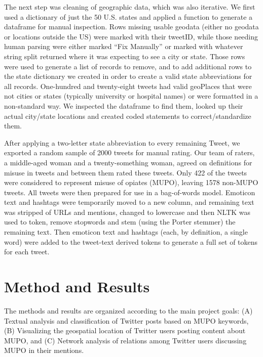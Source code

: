 \documentclass[sigconf]{acmart}
\begin{document}

The next step was cleaning of geographic data, which was also iterative. We 
first used a dictionary of just the 50 U.S. states and applied a function to 
generate a dataframe for manual inspection. Rows missing usable geodata (either 
no geodata or locations outside the US) were marked with their tweetID, while 
those needing human parsing were either marked ``Fix Manually'' or marked with 
whatever string split returned where it was expecting to see a city or state. 
Those rows were used to generate a list of records to remove, and to add 
additional rows to the state dictionary we created in order to create a valid 
state abbreviations for all records. One-hundred and twenty-eight tweets had 
valid geoPlaces that were not cities or states (typically university or hospital 
names) or were formatted in a non-standard way. We inspected the dataframe to 
find them, looked up their actual city/state locations and created coded 
statements to correct/standardize them.
 
After applying a two-letter state abbreviation to every remaining Tweet, we 
exported a random sample of 2000 tweets for manual rating. Our team of raters, 
a middle-aged woman and a twenty-something woman, agreed on definitions for 
misuse in tweets and between them rated these tweets. Only 422 of the tweets 
were considered to represent misuse of opiates (MUPO), leaving 1578 non-MUPO 
tweets. All tweets were then prepared for use in a bag-of-words model. Emoticon 
text and hashtags were temporarily moved to a new column, and remaining text 
was stripped of URLs and mentions, changed to lowercase and then NLTK was used 
to token, remove stopwords and stem (using the Porter stemmer) the remaining text. 
Then emoticon text and hashtags (each, by definition, a single word) were added 
to the tweet-text derived tokens to generate a full set of tokens for each tweet.


\section{Method and Results}
The methods and results are organized according to the main project goals: 
(A) Textual analysis and classification of Twitter posts based on MUPO keywords, 
(B) Visualizing the geospatial location of Twitter users posting content about
MUPO, and (C) Network analysis of relations among Twitter users discussing
MUPO in their mentions.  
\end{document}
